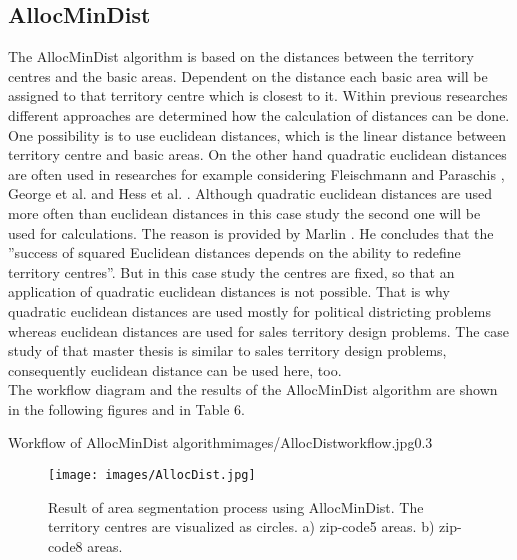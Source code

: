 \subsection{AllocMinDist}

The AllocMinDist algorithm is based on the distances between the territory centres and the basic areas. Dependent on the distance each basic area will be assigned to that territory centre which is closest to it. Within previous researches different approaches are determined how the calculation of distances can be done. One possibility is to use euclidean distances, which is the linear distance between territory centre and basic areas. On the other hand quadratic euclidean distances are often used in researches for example considering Fleischmann and Paraschis \cite{fleischmann}, George et al. \cite{george} and Hess et al. \cite{hess}. Although quadratic euclidean distances are used more often than euclidean distances in this case study the second one will be used for calculations. The reason is provided by Marlin \cite{marlin}. He concludes that the ''success of squared Euclidean distances depends on the ability to redefine territory centres''\cite{marlin}. But in this case study the centres are fixed, so that an application of quadratic euclidean distances is not possible. That is why quadratic euclidean distances are used mostly for political districting problems whereas euclidean distances are used for sales territory design problems. The case study of that master thesis is similar to sales territory design problems, consequently euclidean distance can be used here, too. \\
The workflow diagram and the results of the AllocMinDist algorithm are shown in the following figures and in Table 6.

\begin{figurevarSize}{Workflow of AllocMinDist algorithm}{images/AllocDistworkflow.jpg}{0.3}\end{figurevarSize}

\begin{figure}[H]
	\centering
	\texttt{[image: images/AllocDist.jpg]}
	\caption[Result of area segmentation process using AllocMinDist.]{Result of area segmentation process using AllocMinDist. The territory centres are visualized as circles. a) zip-code5 areas. b) zip-code8 areas.}
\end{figure}  


